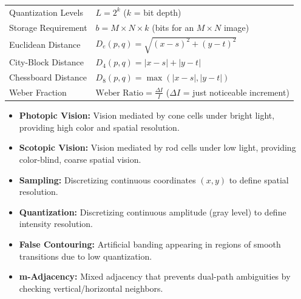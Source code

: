 \documentclass[12pt,a4paper]{article}
\renewcommand{\arraystretch}{1.45}
\begin{document}
\begin{tcolorbox}[formulabox, title={\textbf{Key Formulas at a Glance}}]
\renewcommand{\arraystretch}{1.3}
\begin{tabularx}{\linewidth}{B{5.0cm} X}Quantization Levels & $L = 2^k$ \quad ($k$ = bit depth) \\
Storage Requirement & $b = M \times N \times k$ \quad (bits for an $M \times N$ image) \\
Euclidean Distance & $D_e(p,q) = \sqrt{(x-s)^2 + (y-t)^2}$ \\
City-Block Distance & $D_4(p,q) = |x-s| + |y-t|$ \\
Chessboard Distance & $D_8(p,q) = \max(|x-s|, |y-t|)$ \\
Weber Fraction & $\text{Weber Ratio} = \frac{\Delta I}{I}$ \quad ($\Delta I$ = just noticeable increment)
\end{tabularx}
\end{tcolorbox}

\begin{tcolorbox}[defbox, title={\textbf{One-Line Definitions}}]
\begin{itemize}[leftmargin=*, itemsep=2.5pt, topsep=0pt]
  \item \textbf{Photopic Vision:} Vision mediated by cone cells under bright light, providing high color and spatial resolution.
  \item \textbf{Scotopic Vision:} Vision mediated by rod cells under low light, providing color-blind, coarse spatial vision.
  \item \textbf{Sampling:} Discretizing continuous coordinates $(x,y)$ to define spatial resolution.
  \item \textbf{Quantization:} Discretizing continuous amplitude (gray level) to define intensity resolution.
  \item \textbf{False Contouring:} Artificial banding appearing in regions of smooth transitions due to low quantization.
  \item \textbf{m-Adjacency:} Mixed adjacency that prevents dual-path ambiguities by checking vertical/horizontal neighbors.
\end{itemize}
\end{tcolorbox}
\end{document}
